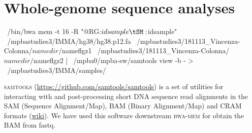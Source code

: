 \section {Whole-genome sequence analyses}




~/bin/bwa mem -t 16 -R "@RG\tID:$idsample\tSM:$idsample" \
/mpbastudies3/IMMA/hg38/hg38.p12.fa \ 
/mpbastudies3/181113\_Vincenza-Colonna/$namedir/$nameflgz1 \ 
/mpbastudies3/181113\_Vincenza-Colonna/$namedir/$nameflgz2 | \ 
/mpba0/mpba-sw/samtools view -b - > \
/mpbastudies3/IMMA/samples/%
  


\textsc{samtools} (\url{https://github.com/samtools/samtools}) is a set of utilities for interacting with and post-processing short DNA sequence read alignments in the SAM (Sequence Alignment/Map), BAM (Binary Alignment/Map) and CRAM formats (\href{https://en.wikipedia.org/wiki/SAMtools}{wiki}). \newline
We have used this software downstream \textsc{bwa-mem} for obtain the BAM from fastq. \newline

